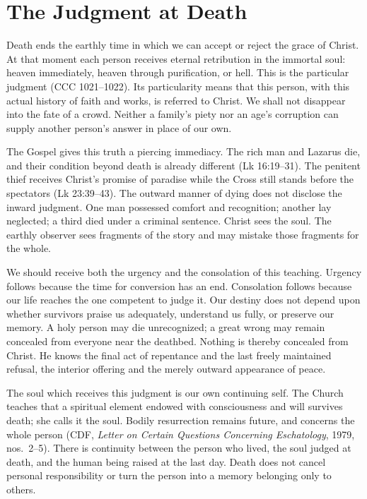 \section{The Judgment at Death}

Death ends the earthly time in which we can accept or reject the grace of Christ. At that moment each person receives eternal retribution in the immortal soul: heaven immediately, heaven through purification, or hell. This is the particular judgment (CCC 1021--1022). Its particularity means that this person, with this actual history of faith and works, is referred to Christ. We shall not disappear into the fate of a crowd. Neither a family's piety nor an age's corruption can supply another person's answer in place of our own.

The Gospel gives this truth a piercing immediacy. The rich man and Lazarus die, and their condition beyond death is already different (Lk 16:19--31). The penitent thief receives Christ's promise of paradise while the Cross still stands before the spectators (Lk 23:39--43). The outward manner of dying does not disclose the inward judgment. One man possessed comfort and recognition; another lay neglected; a third died under a criminal sentence. Christ sees the soul. The earthly observer sees fragments of the story and may mistake those fragments for the whole.

We should receive both the urgency and the consolation of this teaching. Urgency follows because the time for conversion has an end. Consolation follows because our life reaches the one competent to judge it. Our destiny does not depend upon whether survivors praise us adequately, understand us fully, or preserve our memory. A holy person may die unrecognized; a great wrong may remain concealed from everyone near the deathbed. Nothing is thereby concealed from Christ. He knows the final act of repentance and the last freely maintained refusal, the interior offering and the merely outward appearance of peace.

The soul which receives this judgment is our own continuing self. The Church teaches that a spiritual element endowed with consciousness and will survives death; she calls it the soul. Bodily resurrection remains future, and concerns the whole person (CDF, \emph{Letter on Certain Questions Concerning Eschatology}, 1979, nos.~2--5). There is continuity between the person who lived, the soul judged at death, and the human being raised at the last day. Death does not cancel personal responsibility or turn the person into a memory belonging only to others.

